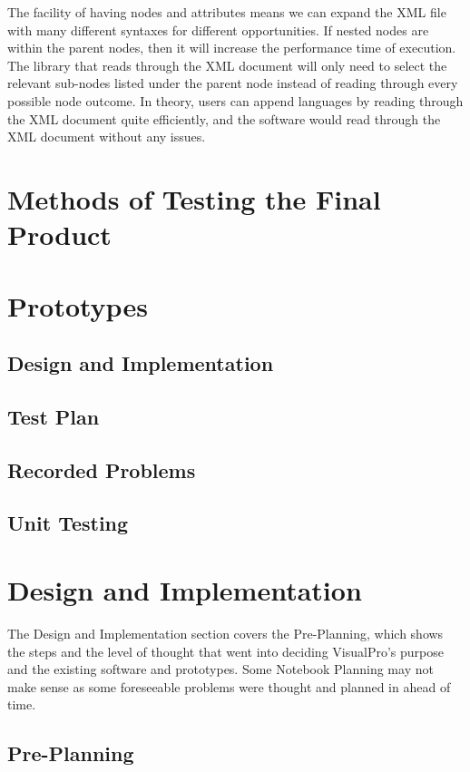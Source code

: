 \documentclass[conference]{IEEEtran}
\begin{document}
        The facility of having nodes and attributes means we can expand the XML file with many different syntaxes for different opportunities. If nested nodes are within the parent nodes, then it will increase the performance time of execution. The library that reads through the XML document will only need to select the relevant sub-nodes listed under the parent node instead of reading through every possible node outcome. In theory, users can append languages by reading through the XML document quite efficiently, and the software would read through the XML document without any issues.

    \section{Methods of Testing the Final Product}
          
    \section{Prototypes}
      \subsection{Design and Implementation}

      \subsection{Test Plan}

      \subsection{Recorded Problems}

      \subsection{Unit Testing}

    \section{Design and Implementation}
      The Design and Implementation section covers the Pre-Planning, which shows the steps and the level of thought that went into deciding VisualPro's purpose and the existing software and prototypes. Some Notebook Planning may not make sense as some foreseeable problems were thought and planned in ahead of time.

      \subsection{Pre-Planning}
\end{document}
